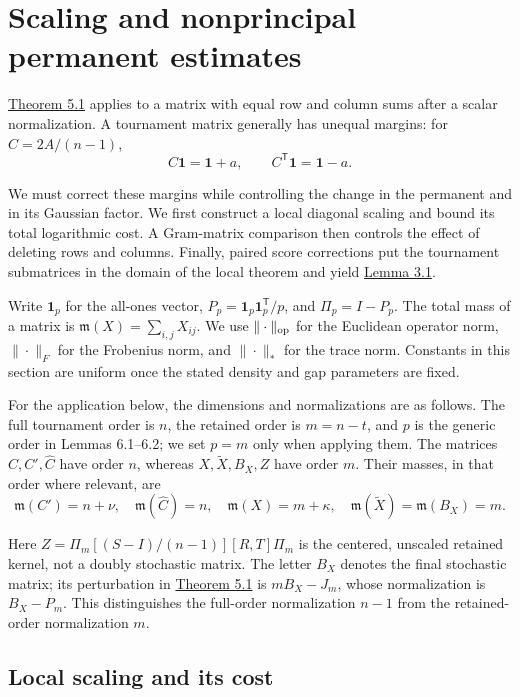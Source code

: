 \documentclass[11pt,a4paper]{article}
\newcommand{\paperref}[2]{\hyperref[#1]{#2}}
\begin{document}
\section{Scaling and nonprincipal permanent estimates}\label{sec-6}

\paperref{thm-5.1}{Theorem 5.1} applies to a matrix with equal row and column sums after a scalar normalization. A tournament matrix generally has unequal margins: for \(C=2A/(n-1)\),
\[C\mathbf1=\mathbf1+a,\qquad C^{\mathsf T}\mathbf1=\mathbf1-a.\]

We must correct these margins while controlling the change in the permanent and in its Gaussian factor. We first construct a local diagonal scaling and bound its total logarithmic cost. A Gram-matrix comparison then controls the effect of deleting rows and columns. Finally, paired score corrections put the tournament submatrices in the domain of the local theorem and yield \paperref{thm-3.1}{Lemma 3.1}.

Write \(\mathbf1_p\) for the all-ones vector, \(P_p=\mathbf1_p\mathbf1_p^{\mathsf T}/p\), and \(\Pi_p=I-P_p\). The total mass of a matrix is \(\mathfrak m(X)=\sum_{i,j}X_{ij}\). We use \(\|\cdot\|_{\rm op}\) for the Euclidean operator norm, \(\|\cdot\|_F\) for the Frobenius norm, and \(\|\cdot\|_*\) for the trace norm. Constants in this section are uniform once the stated density and gap parameters are fixed.

For the application below, the dimensions and normalizations are as follows. The full tournament order is \(n\), the retained order is \(m=n-t\), and \(p\) is the generic order in Lemmas 6.1--6.2; we set \(p=m\) only when applying them. The matrices \(C,C',\widehat C\) have order \(n\), whereas \(X,\widetilde X,B_X,Z\) have order \(m\). Their masses, in that order where relevant, are
\[\mathfrak m(C')=n+\nu,\quad \mathfrak m(\widehat C)=n,\quad
\mathfrak m(X)=m+\kappa,\quad
\mathfrak m(\widetilde X)=\mathfrak m(B_X)=m.\]

Here \(Z=\Pi_m[(S-I)/(n-1)][R,T]\Pi_m\) is the centered, unscaled retained kernel, not a doubly stochastic matrix. The letter \(B_X\) denotes the final stochastic matrix; its perturbation in \paperref{thm-5.1}{Theorem 5.1} is \(mB_X-J_m\), whose normalization is \(B_X-P_m\). This distinguishes the full-order normalization \(n-1\) from the retained-order normalization \(m\).

\subsection{Local scaling and its cost}\label{sec-6.1}
\end{document}
